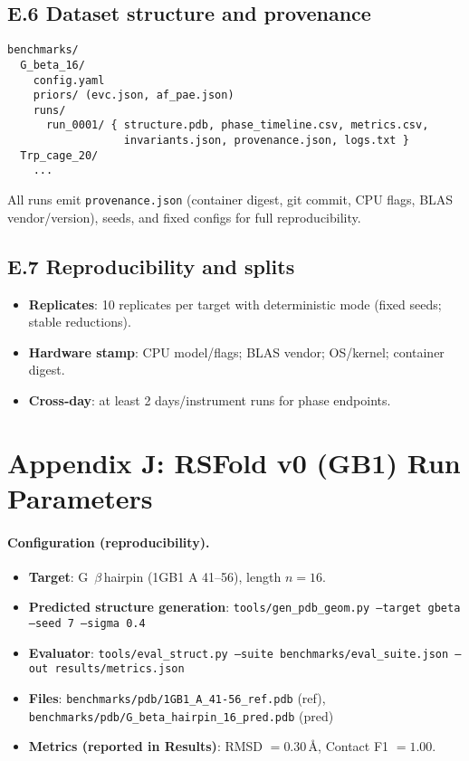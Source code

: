 \documentclass[12pt,a4paper]{article}
\begin{document}
\subsection*{E.6 Dataset structure and provenance}
\begin{verbatim}
benchmarks/
  G_beta_16/
    config.yaml
    priors/ (evc.json, af_pae.json)
    runs/
      run_0001/ { structure.pdb, phase_timeline.csv, metrics.csv,
                  invariants.json, provenance.json, logs.txt }
  Trp_cage_20/
    ...
\end{verbatim}
All runs emit \texttt{provenance.json} (container digest, git commit, CPU flags, BLAS vendor/version), seeds, and fixed configs for full reproducibility.

\subsection*{E.7 Reproducibility and splits}
\begin{itemize}
  \item \textbf{Replicates}: 10 replicates per target with deterministic mode (fixed seeds; stable reductions).
  \item \textbf{Hardware stamp}: CPU model/flags; BLAS vendor; OS/kernel; container digest.
  \item \textbf{Cross‑day}: at least 2 days/instrument runs for phase endpoints.
\end{itemize}

\section*{Appendix J: RS\textendash Fold v0 (GB1) Run Parameters}
\paragraph{Configuration (reproducibility).}
\begin{itemize}
  \item \textbf{Target}: G~$\beta$\,hairpin (1GB1 A 41--56), length $n=16$.
  \item \textbf{Predicted structure generation}: \texttt{tools/gen\_pdb\_geom.py --target gbeta --seed 7 --sigma 0.4}
  \item \textbf{Evaluator}: \texttt{tools/eval\_struct.py --suite benchmarks/eval\_suite.json --out results/metrics.json}
  \item \textbf{Files}: \texttt{benchmarks/pdb/1GB1\_A\_41-56\_ref.pdb} (ref), \texttt{benchmarks/pdb/G\_beta\_hairpin\_16\_pred.pdb} (pred)
  \item \textbf{Metrics (reported in Results)}: RMSD $=0.30$\,\AA, Contact F1 $=1.00$.
\end{itemize}
\end{document}

